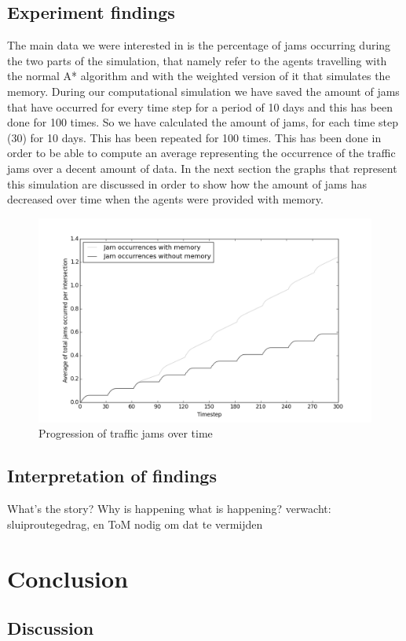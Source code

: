 \documentclass[a4paper,hidelinks]{article}
\begin{document}
\subsection{Experiment findings}
The main data we were interested in is the percentage of jams occurring during the two parts of the simulation, that namely refer to the agents travelling with the normal A* algorithm and with the weighted version of it that simulates the memory. During our computational simulation we have saved the amount of jams that have occurred for every time step for a period of 10 days and this has been done for 100 times. So we have calculated the amount of jams, for each time step (30) for 10 days. This has been repeated for 100 times. This has been done in order to be able to compute an average representing the occurrence of the traffic jams over a decent amount of data. In the next section the graphs that represent this simulation are discussed in order to show how the amount of jams has decreased over time when the agents were provided with memory.  

\begin{figure}[ht!]
\centering
\includegraphics[width = 0.7\linewidth]{100sims-mem-vs-nomem}
\caption{Progression of traffic jams over time\label{overflow}}
\end{figure} 

\subsection{Interpretation of findings}
What's the story? Why is happening what is happening? verwacht: sluiproutegedrag, en ToM nodig om dat te vermijden

\section{Conclusion}
\subsection{Discussion}
\end{document}
